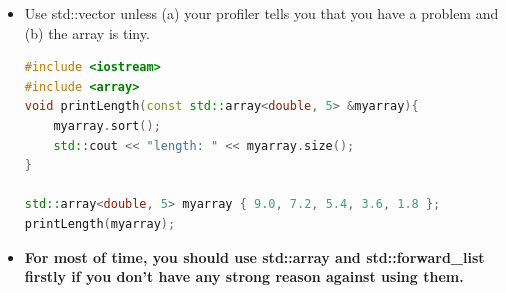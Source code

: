 \documentclass[a4paper,12pt,twoside]{book}
\begin{document}
\begin{itemize}
\item Use std::vector unless (a) your profiler tells you that you have a problem and (b) the array is tiny.
\begin{lstlisting}[frame=single, language=c++]
#include <iostream>
#include <array>
void printLength(const std::array<double, 5> &myarray){
    myarray.sort();
    std::cout << "length: " << myarray.size();
}

std::array<double, 5> myarray { 9.0, 7.2, 5.4, 3.6, 1.8 };
printLength(myarray);
\end{lstlisting}


\item \textbf{For most of time, you should use std::array and std::forward\_list firstly if you don't have any strong reason against using them.} 
\end{itemize}
\end{document}
